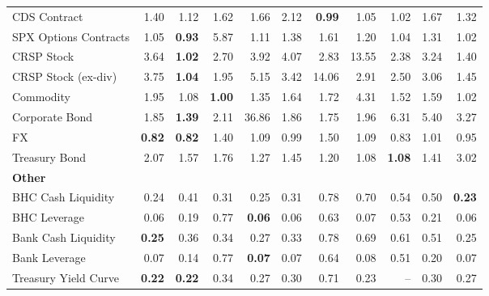 \begin{table}[htbp]
\begin{tabular}{@{}lrrrrrrrrrr@{}}
CDS Contract & 1.40 & 1.12 & 1.62 & 1.66 & 2.12 & \textbf{0.99} & 1.05 & 1.02 & 1.67 & 1.32 \\
SPX Options Contracts & 1.05 & \textbf{0.93} & 5.87 & 1.11 & 1.38 & 1.61 & 1.20 & 1.04 & 1.31 & 1.02 \\
CRSP Stock & 3.64 & \textbf{1.02} & 2.70 & 3.92 & 4.07 & 2.83 & 13.55 & 2.38 & 3.24 & 1.40 \\
CRSP Stock (ex-div) & 3.75 & \textbf{1.04} & 1.95 & 5.15 & 3.42 & 14.06 & 2.91 & 2.50 & 3.06 & 1.45 \\
Commodity & 1.95 & 1.08 & \textbf{1.00} & 1.35 & 1.64 & 1.72 & 4.31 & 1.52 & 1.59 & 1.02 \\
Corporate Bond & 1.85 & \textbf{1.39} & 2.11 & 36.86 & 1.86 & 1.75 & 1.96 & 6.31 & 5.40 & 3.27 \\
FX & \textbf{0.82} & \textbf{0.82} & 1.40 & 1.09 & 0.99 & 1.50 & 1.09 & 0.83 & 1.01 & 0.95 \\
Treasury Bond & 2.07 & 1.57 & 1.76 & 1.27 & 1.45 & 1.20 & 1.08 & \textbf{1.08} & 1.41 & 3.02 \\
\midrule
\multicolumn{11}{l}{\textbf{Other}} \\
BHC Cash Liquidity & 0.24 & 0.41 & 0.31 & 0.25 & 0.31 & 0.78 & 0.70 & 0.54 & 0.50 & \textbf{0.23} \\
BHC Leverage & 0.06 & 0.19 & 0.77 & \textbf{0.06} & 0.06 & 0.63 & 0.07 & 0.53 & 0.21 & 0.06 \\
Bank Cash Liquidity & \textbf{0.25} & 0.36 & 0.34 & 0.27 & 0.33 & 0.78 & 0.69 & 0.61 & 0.51 & 0.25 \\
Bank Leverage & 0.07 & 0.14 & 0.77 & \textbf{0.07} & 0.07 & 0.64 & 0.08 & 0.51 & 0.20 & 0.07 \\
Treasury Yield Curve & \textbf{0.22} & \textbf{0.22} & 0.34 & 0.27 & 0.30 & 0.71 & 0.23 & -- & 0.30 & 0.27 \\
\bottomrule
\end{tabular}
\vspace{0.1cm}

\end{table}

